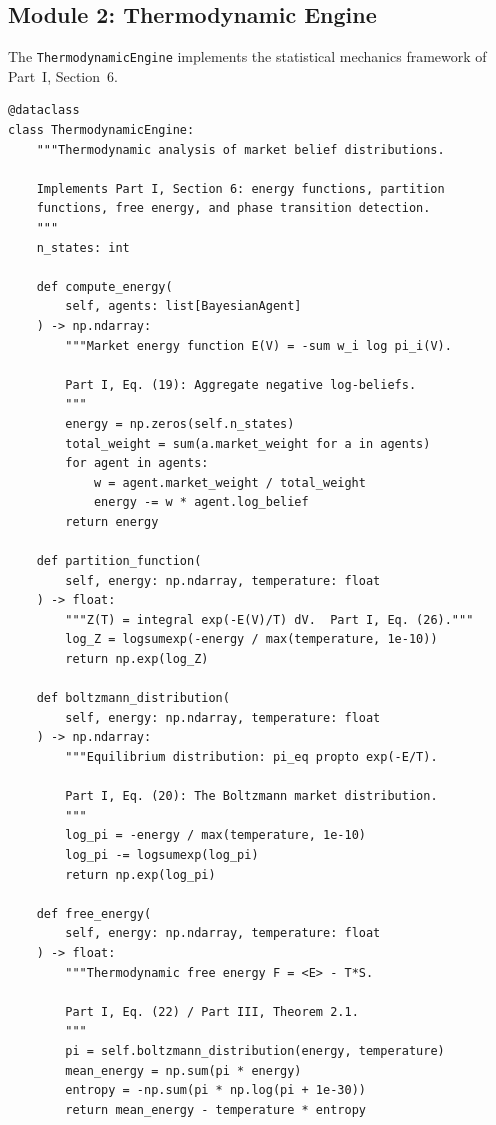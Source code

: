 \documentclass[12pt,a4paper]{article}
\theoremstyle{definition}
\begin{document}
\subsection{Module 2: Thermodynamic Engine}

The \texttt{ThermodynamicEngine} implements the statistical mechanics framework of Part~I, Section~6.

\begin{lstlisting}[caption={Thermodynamic Engine --- Energy, free energy, phase transitions (Part~I, \S 6)},label=lst:thermo]
@dataclass
class ThermodynamicEngine:
    """Thermodynamic analysis of market belief distributions.
    
    Implements Part I, Section 6: energy functions, partition
    functions, free energy, and phase transition detection.
    """
    n_states: int
    
    def compute_energy(
        self, agents: list[BayesianAgent]
    ) -> np.ndarray:
        """Market energy function E(V) = -sum w_i log pi_i(V).
        
        Part I, Eq. (19): Aggregate negative log-beliefs.
        """
        energy = np.zeros(self.n_states)
        total_weight = sum(a.market_weight for a in agents)
        for agent in agents:
            w = agent.market_weight / total_weight
            energy -= w * agent.log_belief
        return energy
    
    def partition_function(
        self, energy: np.ndarray, temperature: float
    ) -> float:
        """Z(T) = integral exp(-E(V)/T) dV.  Part I, Eq. (26)."""
        log_Z = logsumexp(-energy / max(temperature, 1e-10))
        return np.exp(log_Z)
    
    def boltzmann_distribution(
        self, energy: np.ndarray, temperature: float
    ) -> np.ndarray:
        """Equilibrium distribution: pi_eq propto exp(-E/T).
        
        Part I, Eq. (20): The Boltzmann market distribution.
        """
        log_pi = -energy / max(temperature, 1e-10)
        log_pi -= logsumexp(log_pi)
        return np.exp(log_pi)
    
    def free_energy(
        self, energy: np.ndarray, temperature: float
    ) -> float:
        """Thermodynamic free energy F = <E> - T*S.
        
        Part I, Eq. (22) / Part III, Theorem 2.1.
        """
        pi = self.boltzmann_distribution(energy, temperature)
        mean_energy = np.sum(pi * energy)
        entropy = -np.sum(pi * np.log(pi + 1e-30))
        return mean_energy - temperature * entropy
    

\end{lstlisting}
\end{document}
